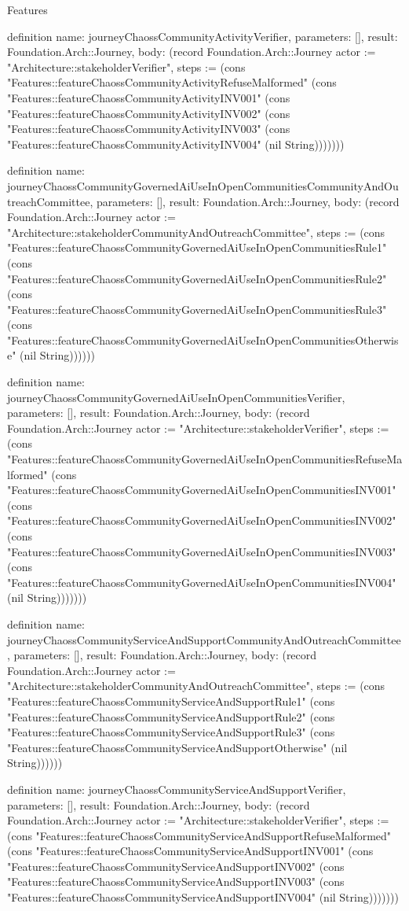 \begin{lexlean}{Features}
\begin{semanticmodule}
definition{
  name: journeyChaossCommunityActivityVerifier,
  parameters: [],
  result: Foundation.Arch::Journey,
  body: (record Foundation.Arch::Journey {actor := "Architecture::stakeholderVerifier", steps := (cons "Features::featureChaossCommunityActivityRefuseMalformed" (cons "Features::featureChaossCommunityActivityINV001" (cons "Features::featureChaossCommunityActivityINV002" (cons "Features::featureChaossCommunityActivityINV003" (cons "Features::featureChaossCommunityActivityINV004" (nil String))))))})
}

definition{
  name: journeyChaossCommunityGovernedAiUseInOpenCommunitiesCommunityAndOutreachCommittee,
  parameters: [],
  result: Foundation.Arch::Journey,
  body: (record Foundation.Arch::Journey {actor := "Architecture::stakeholderCommunityAndOutreachCommittee", steps := (cons "Features::featureChaossCommunityGovernedAiUseInOpenCommunitiesRule1" (cons "Features::featureChaossCommunityGovernedAiUseInOpenCommunitiesRule2" (cons "Features::featureChaossCommunityGovernedAiUseInOpenCommunitiesRule3" (cons "Features::featureChaossCommunityGovernedAiUseInOpenCommunitiesOtherwise" (nil String)))))})
}

definition{
  name: journeyChaossCommunityGovernedAiUseInOpenCommunitiesVerifier,
  parameters: [],
  result: Foundation.Arch::Journey,
  body: (record Foundation.Arch::Journey {actor := "Architecture::stakeholderVerifier", steps := (cons "Features::featureChaossCommunityGovernedAiUseInOpenCommunitiesRefuseMalformed" (cons "Features::featureChaossCommunityGovernedAiUseInOpenCommunitiesINV001" (cons "Features::featureChaossCommunityGovernedAiUseInOpenCommunitiesINV002" (cons "Features::featureChaossCommunityGovernedAiUseInOpenCommunitiesINV003" (cons "Features::featureChaossCommunityGovernedAiUseInOpenCommunitiesINV004" (nil String))))))})
}

definition{
  name: journeyChaossCommunityServiceAndSupportCommunityAndOutreachCommittee,
  parameters: [],
  result: Foundation.Arch::Journey,
  body: (record Foundation.Arch::Journey {actor := "Architecture::stakeholderCommunityAndOutreachCommittee", steps := (cons "Features::featureChaossCommunityServiceAndSupportRule1" (cons "Features::featureChaossCommunityServiceAndSupportRule2" (cons "Features::featureChaossCommunityServiceAndSupportRule3" (cons "Features::featureChaossCommunityServiceAndSupportOtherwise" (nil String)))))})
}

definition{
  name: journeyChaossCommunityServiceAndSupportVerifier,
  parameters: [],
  result: Foundation.Arch::Journey,
  body: (record Foundation.Arch::Journey {actor := "Architecture::stakeholderVerifier", steps := (cons "Features::featureChaossCommunityServiceAndSupportRefuseMalformed" (cons "Features::featureChaossCommunityServiceAndSupportINV001" (cons "Features::featureChaossCommunityServiceAndSupportINV002" (cons "Features::featureChaossCommunityServiceAndSupportINV003" (cons "Features::featureChaossCommunityServiceAndSupportINV004" (nil String))))))})
}


\end{semanticmodule}
\end{lexlean}
